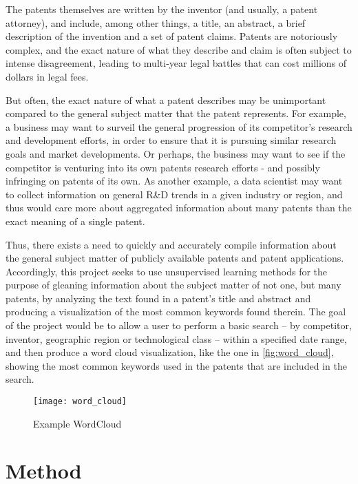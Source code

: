 \documentclass{article}
\begin{document}
The patents themselves are written by the inventor (and usually, a patent attorney), and include, among other things, a title, an abstract, a brief description of the invention and a set of patent claims.  Patents are notoriously complex, and the exact nature of what they describe and claim is often subject to intense disagreement, leading to multi-year legal battles that can cost millions of dollars in legal fees.

But often, the exact nature of what a patent describes may be unimportant compared to the general subject matter that the patent represents.  For example, a business may want to surveil the general progression of its competitor’s research and development efforts, in order to ensure that it is pursuing similar research goals and market developments.  Or perhaps, the business may want to see if the competitor is venturing  into its own patents research efforts - and possibly infringing on patents of its own.  As another example, a data scientist may want to collect information on general R\&D trends in a given industry or region, and thus would care more about aggregated information about many patents than the exact meaning of a single patent.

Thus, there exists a need to quickly and accurately compile information about the general subject matter of publicly available patents and patent applications.  Accordingly, this project seeks to use unsupervised learning methods for the purpose of gleaning information about the subject matter of not one, but many patents, by analyzing the text found in a patent’s title and abstract and producing a visualization of the most common keywords found therein.  The goal of the project would be to allow a user to perform a basic search – by competitor, inventor, geographic region or technological class  – within a specified date range, and then produce a word cloud visualization, like the one in \autoref{fig:word_cloud}, showing the most common keywords used in the patents that are included in the search.

\begin{figure}[H]
\texttt{[image: word\_cloud]}
\centering
\caption{Example WordCloud\protect\cite{website:wc_image}}
\label{fig:word_cloud}
\end{figure}

\section{Method}
\label{method}
\end{document}
